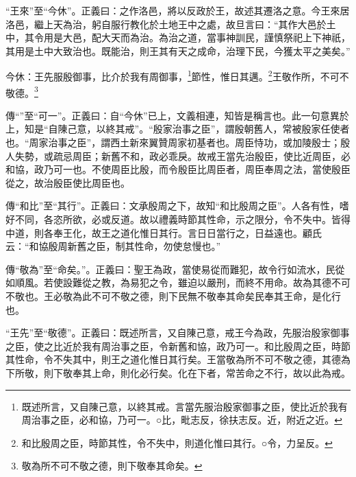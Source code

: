 {\noindent\shu{}\fzkt “王來”至“今休”。正義曰：之作洛邑，將以反政於王，故述其遷洛之意。今王來居洛邑，繼上天為治，躬自服行教化於土地王中之處，故旦言曰：“其作大邑於土中，其令用是大邑，配大天而為治。為治之道，當事神訓民，謹慎祭祀上下神祇，其用是土中大致治也。既能治，則王其有天之成命，治理下民，今獲太平之美矣。” \par}

今休：王先服殷御事，比介於我有周御事，\footnote{既述所言，又自陳己意，以終其戒。言當先服治殷家御事之臣，使比近於我有周治事之臣，必和協，乃可一。○比，毗志反，徐扶志反。近，附近之近。}節性，惟日其邁。\footnote{和比殷周之臣，時節其性，令不失中，則道化惟曰其行。○令，力呈反。}王敬作所，不可不敬德。\footnote{敬為所不可不敬之德，則下敬奉其命矣。}


{\noindent\zhuan{}\fzbyks 傳“”至“可一”。正義曰：自“今休”已上，文義相連，知皆是稱言也。此一句意異於上，知是“自陳己意，以終其戒”。“殷家治事之臣”，謂殷朝舊人，常被殷家任使者也。“周家治事之臣”，謂西土新來翼贊周家初基者也。周臣恃功，或加陵殷士；殷人失勢，或疏忌周臣；新舊不和，政必乖戾。故戒王當先治殷臣，使比近周臣，必和協，政乃可一也。不使周臣比殷，而令殷臣比周臣者，周臣奉周之法，當使殷臣從之，故治殷臣使比周臣也。 \par}

{\noindent\zhuan{}\fzbyks 傳“和比”至“其行”。正義曰：文承殷周之下，故知“和比殷周之臣”。人各有性，嗜好不同，各恣所欲，必或反道。故以禮義時節其性命，示之限分，令不失中。皆得中道，則各奉王化，故王之道化惟日其行。言日日當行之，日益遠也。顧氏云：“和協殷周新舊之臣，制其性命，勿使怠慢也。” \par}

{\noindent\zhuan{}\fzbyks 傳“敬為”至“命矣。”。正義曰：聖王為政，當使易從而難犯，故令行如流水，民從如順風。若使設難從之教，為易犯之令，雖迫以嚴刑，而終不用命。故為其德不可不敬也。王必敬為此不可不敬之德，則下民無不敬奉其命矣民奉其王命，是化行也。 \par}

{\noindent\shu{}\fzkt “王先”至“敬德”。正義曰：既述所言，又自陳己意，戒王今為政，先服治殷家御事之臣，使之比近於我有周治事之臣，令新舊和協，政乃可一。和比殷周之臣，時節其性命，令不失其中，則王之道化惟日其行矣。王當敬為所不可不敬之德，其德為下所敬，則下敬奉其上命，則化必行矣。化在下者，常苦命之不行，故以此為戒。 \par}

